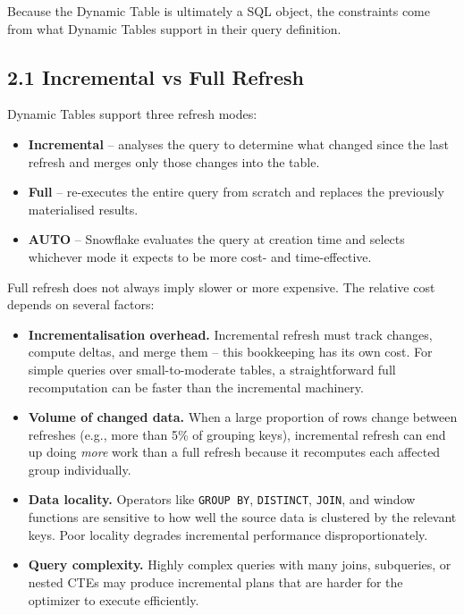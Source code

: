 \documentclass[
  letterpaper,
  DIV=11,
  numbers=noendperiod]{scrreprt}
\providecommand{\tightlist}{%
  \setlength{\itemsep}{0pt}\setlength{\parskip}{0pt}}\usepackage{longtable,booktabs,array}
\begin{document}
Because the Dynamic Table is ultimately a SQL object, the constraints
come from what Dynamic Tables support in their query definition.

\hypertarget{incremental-vs-full-refresh}{%
\subsection{2.1 Incremental vs Full
Refresh}\label{incremental-vs-full-refresh}}

Dynamic Tables support three refresh modes:

\begin{itemize}
\tightlist
\item
  \textbf{Incremental} -- analyses the query to determine what changed
  since the last refresh and merges only those changes into the table.
\item
  \textbf{Full} -- re-executes the entire query from scratch and
  replaces the previously materialised results.
\item
  \textbf{AUTO} -- Snowflake evaluates the query at creation time and
  selects whichever mode it expects to be more cost- and time-effective.
\end{itemize}

Full refresh does not always imply slower or more expensive. The
relative cost depends on several factors:

\begin{itemize}
\tightlist
\item
  \textbf{Incrementalisation overhead.} Incremental refresh must track
  changes, compute deltas, and merge them -- this bookkeeping has its
  own cost. For simple queries over small-to-moderate tables, a
  straightforward full recomputation can be faster than the incremental
  machinery.
\item
  \textbf{Volume of changed data.} When a large proportion of rows
  change between refreshes (e.g., more than 5\% of grouping keys),
  incremental refresh can end up doing \emph{more} work than a full
  refresh because it recomputes each affected group individually.
\item
  \textbf{Data locality.} Operators like \texttt{GROUP\ BY},
  \texttt{DISTINCT}, \texttt{JOIN}, and window functions are sensitive
  to how well the source data is clustered by the relevant keys. Poor
  locality degrades incremental performance disproportionately.
\item
  \textbf{Query complexity.} Highly complex queries with many joins,
  subqueries, or nested CTEs may produce incremental plans that are
  harder for the optimizer to execute efficiently.
\end{itemize}
\end{document}
